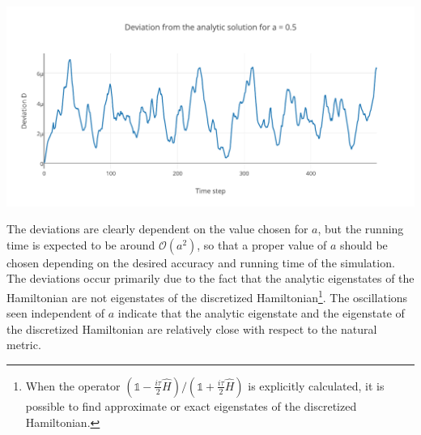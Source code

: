 \begin{Figure}
    \centering
    \includegraphics[width=\linewidth]{distancea02.pdf}
    \label{fig:distancea02}
\end{Figure} The deviations are clearly dependent on the value chosen for $a$, but the running time is expected to be around $\mathcal{O}(a^2)$, so that a proper value of $a$ should be chosen depending on the desired accuracy and running time of the simulation. The deviations occur primarily due to the fact that the analytic eigenstates of the Hamiltonian are not eigenstates of the discretized Hamiltonian\footnote{When the operator $(\mathbb{1}-\frac{i\tau}{2}\hat{H})/(\mathbb{1}+\frac{i\tau}{2}\hat{H})$ is explicitly calculated, it is possible to find approximate or exact eigenstates of the discretized Hamiltonian.}. The oscillations seen independent of $a$ indicate that the analytic eigenstate and the eigenstate of the discretized Hamiltonian are relatively close with respect to the natural metric.


